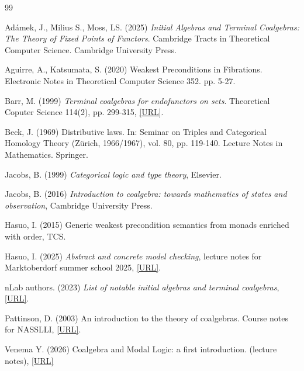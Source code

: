 \documentclass[
		head_space=20mm,
		foot_space=20mm,
		gutter=10mm,
		line_length=190mm
]{jlreq}
\begin{document}
\begin{thebibliography}{99}
    \item Ad\'{a}mek, J., Milius S., Moss, LS. (2025) \textit{Initial Algebras and Terminal Coalgebras: The Theory of Fixed Points of Functors}. Cambridge Tracts in Theoretical Computer Science. Cambridge University Press. 
    \item Aguirre, A., Katsumata, S. (2020) Weakest Preconditions in Fibrations. Electronic Notes in Theoretical Computer Science 352. pp. 5-27.
    \item Barr, M. (1999) \textit{Terminal coalgebras for endofunctors on sets}. Theoretical Coputer Science 114(2), pp. 299-315, \href{https://www.math.mcgill.ca/barr/papers/trmclg.pdf}{[URL]}. 
    \item Beck, J. (1969) Distributive laws. In: Seminar on Triples and Categorical Homology Theory (Zürich, 1966/1967), vol. 80, pp. 119-140. Lecture Notes in Mathematics. Springer.
    \item Jacobs, B. (1999) \textit{Categorical logic and type theory}, Elsevier.
    \item Jacobs, B. (2016) \textit{Introduction to coalgebra: towards mathematics of states and observation}, Cambridge University Press.
    \item Hasuo, I. (2015) Generic weakest precondition semantics from monads enriched with order, TCS.
    \item Hasuo, I. (2025) \textit{Abstract and concrete model checking}, lecture notes for Marktoberdorf summer school 2025, \href{https://group-mmm.org/~ichiro/papers/hasuoMOD25LectNotes.pdf}{[URL]}.
    \item nLab authors. (2023) \textit{List of notable initial algebras and terminal coalgebras}, \href{https://ncatlab.org/nlab/show/list+of+notable+initial+algebras+and+terminal+coalgebras}{[URL]}.
    \item Pattinson, D. (2003) An introduction to the theory of coalgebras. Course notes for NASSLLI, \href{https://nasslli.sitehost.iu.edu/2003/datas/DirkPattinson.pdf}{[URL]}.
    \item Venema Y. (2026) Coalgebra and Modal Logic: a first introduction. (lecture notes), \href{https://staff.science.uva.nl/y.venema/teaching/ml/}{[URL]}
\end{thebibliography}
\clearpage
\end{document}
